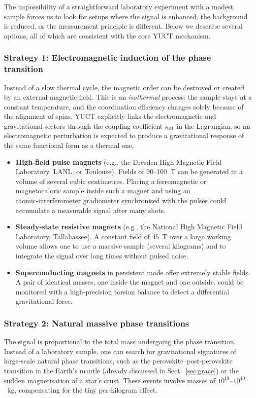 \documentclass[12pt]{article}
\theoremstyle{remark}
\begin{document}
	The impossibility of a straightforward laboratory experiment with a modest sample forces
	us to look for setups where the signal is enhanced, the background is reduced, or the
	measurement principle is different.  Below we describe several options, all of which are
	consistent with the core YUCT mechanism.
	
	\subsubsection*{Strategy 1: Electromagnetic induction of the phase transition}
	Instead of a slow thermal cycle, the magnetic order can be destroyed or created by an
	external magnetic field.  This is an \emph{isothermal} process: the sample stays at a
	constant temperature, and the coordination efficiency changes solely because of the
	alignment of spins.  YUCT explicitly links the electromagnetic and gravitational sectors
	through the coupling coefficient $\kappa_{01}$ in the Lagrangian, so an electromagnetic
	perturbation is expected to produce a gravitational response of the same functional form
	as a thermal one.
	
	\begin{itemize}
		\item \textbf{High‑field pulse magnets} (e.g., the Dresden High Magnetic Field
		Laboratory, LANL, or Toulouse).  Fields of 90--100~T can be generated in a volume of
		several cubic centimetres.  Placing a ferromagnetic or magnetocaloric sample inside
		such a magnet and using an atomic‑interferometer gradiometer synchronised with the
		pulses could accumulate a measurable signal after many shots.
		\item \textbf{Steady‑state resistive magnets} (e.g., the National High Magnetic Field
		Laboratory, Tallahassee).  A constant field of 45~T over a large working volume allows
		one to use a massive sample (several kilograms) and to integrate the signal over long
		times without pulsed noise.
		\item \textbf{Superconducting magnets} in persistent mode offer extremely stable
		fields.  A pair of identical masses, one inside the magnet and one outside, could be
		monitored with a high‑precision torsion balance to detect a differential gravitational
		force.
	\end{itemize}
	
	\subsubsection*{Strategy 2: Natural massive phase transitions}
	The signal is proportional to the total mass undergoing the phase transition.  Instead of
	a laboratory sample, one can search for gravitational signatures of large‑scale natural
	phase transitions, such as the perovskite–post‑perovskite transition in the Earth's mantle
	(already discussed in Sect.~\ref{sec:grace}) or the sudden magnetisation of a star's crust.
	These events involve masses of $10^{18}$–$10^{40}$~kg, compensating for the tiny
	per‑kilogram effect.
	
\end{document}
